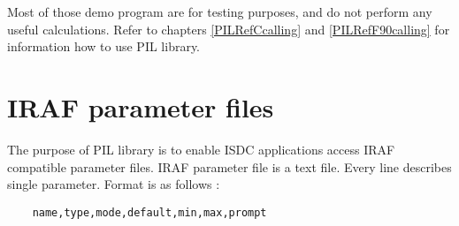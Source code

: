 Most of those demo program are for testing purposes, and do not perform 
any useful calculations. Refer to chapters \ref{PILRefCcalling} and
\ref{PILRefF90calling} for information how to use PIL library.

\section{IRAF parameter files}\label{PILRefParFiles}

The purpose of PIL library is to enable ISDC applications access IRAF
compatible parameter files. IRAF parameter file is a text file.
Every line describes single parameter. Format is as follows : 

\begin{verbatim}
    name,type,mode,default,min,max,prompt 
\end{verbatim}

